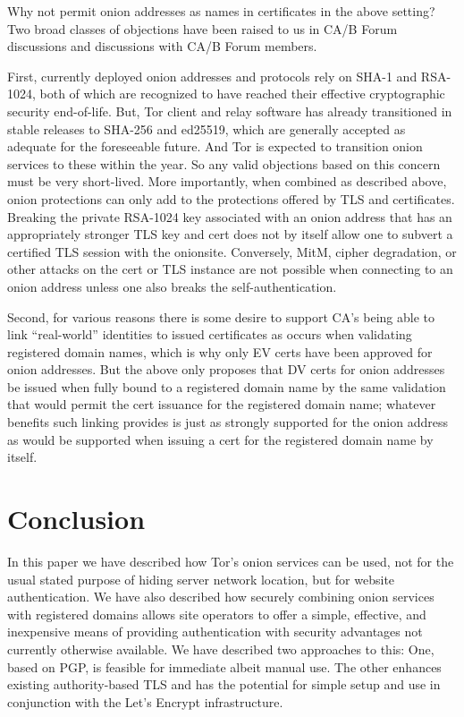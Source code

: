 \documentclass[10pt, conference, compsocconf]{styles/IEEEtran}
\begin{document}
Why not permit onion addresses as names in certificates in the above
setting? Two broad classes of objections have been raised to us in
CA/B Forum discussions and discussions with CA/B Forum members.

First, currently deployed onion addresses and protocols rely on SHA-1
and RSA-1024, both of which are recognized to have reached their
effective cryptographic security end-of-life. But, Tor client and
relay software has already transitioned in stable releases to SHA-256
and ed25519, which are generally accepted as adequate for the
foreseeable future. And Tor is expected to transition onion services
to these within the year. So any valid objections based on this
concern must be very short-lived.  More importantly, when combined as
described above, onion protections can only add to the
protections offered by TLS and certificates. Breaking the
private RSA-1024 key associated with an onion address that has an
appropriately stronger TLS key and cert does not by itself allow one
to subvert a certified TLS session with the onionsite. Conversely,
MitM, cipher degradation, or other attacks on the cert or TLS instance
are not possible when connecting to an onion address unless one also breaks
the self-authentication.

Second, for various reasons there is some desire to support CA's being
able to link ``real-world'' identities to issued certificates as
occurs when validating registered domain names, which is why only EV
certs have been approved for onion addresses. But the above only
proposes that DV certs for onion addresses be issued when fully bound
to a registered domain name by the same validation that would permit
the cert issuance for the registered domain name; whatever benefits
such linking provides is just as strongly supported for the onion
address as would be supported when issuing a cert for the registered
domain name by itself.

\section{Conclusion}

In this paper we have described how Tor's onion services can be used,
not for the usual stated purpose of hiding server network location,
but for website authentication.  We have also described how securely
combining onion services with registered domains allows site operators
to offer a simple, effective, and inexpensive means of providing
authentication with security advantages not currently otherwise
available. We have described two approaches to this: One, based on
PGP, is feasible for immediate albeit manual use.
The other enhances existing authority-based TLS and has the potential
for simple setup and use in conjunction with the Let's Encrypt
infrastructure.
\end{document}
